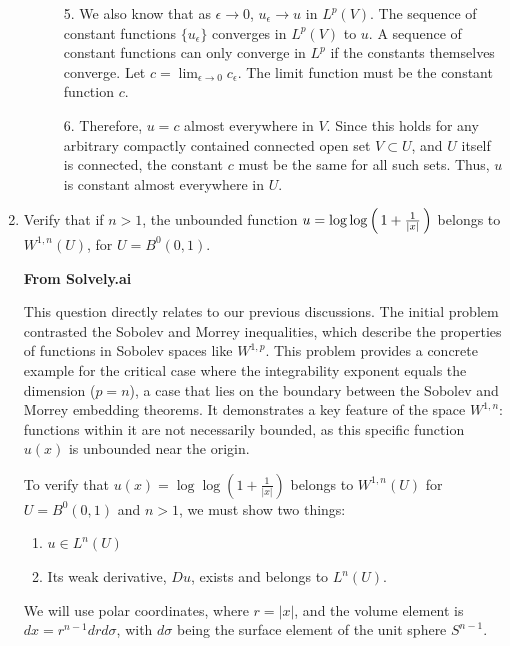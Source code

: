 \documentclass[12pt,a4paper]{report}
\begin{document}
\begin{enumerate}
\begin{description}
5.  We also know that as \(\epsilon \to 0\), \(u_\epsilon \to u\) in \(L^p(V)\). The sequence of constant functions \(\{u_\epsilon\}\) converges in \(L^p(V)\) to \(u\). A sequence of constant functions can only converge in \(L^p\) if the constants themselves converge. Let \(c = \lim_{\epsilon \to 0} c_\epsilon\). The limit function must be the constant function \(c\).

6.  Therefore, \(u = c\) almost everywhere in \(V\). Since this holds for any arbitrary compactly contained connected open set \(V \subset U\), and \(U\) itself is connected, the constant \(c\) must be the same for all such sets. Thus, \(u\) is constant almost everywhere in \(U\).
	
\end{description}
	\HLINE
	\newpage
	\setcounter{enumi}{13}
	\item Verify that if $n>1$, the unbounded function $u=\log\log\left (\, 1 + \frac{1}{|x|} \,\right )$ belongs to $W^{1,n}(U)$, for $U=B^0(0,1)$.
	
	\textbf{From Solvely.ai}
	
	This question directly relates to our previous discussions. The initial problem contrasted the Sobolev and Morrey inequalities, which describe the properties of functions in Sobolev spaces like $W^{1,p}$. This problem provides a concrete example for the critical case where the integrability exponent equals the dimension ($p=n$), a case that lies on the boundary between the Sobolev and Morrey embedding theorems. It demonstrates a key feature of the space $W^{1,n}$: functions within it are not necessarily bounded, as this specific function $u(x)$ is unbounded near the origin.

To verify that $u(x) = \log\log(1 + \frac{1}{|x|})$ belongs to $W^{1,n}(U)$ for $U=B^0(0,1)$ and $n>1$, we must show two things:
\begin{enumerate}

\item   $u \in L^n(U)$
\item   Its weak derivative, $Du$, exists and belongs to $L^n(U)$.

\end{enumerate}

We will use polar coordinates, where $r = |x|$, and the volume element is $dx = r^{n-1} dr d\sigma$, with $d\sigma$ being the surface element of the unit sphere $S^{n-1}$.

\end{enumerate}
\end{document}
